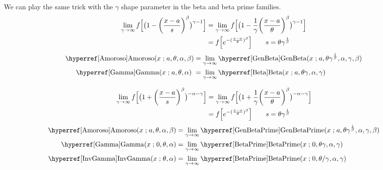 We can play the same trick with the $\gamma$ shape parameter in the beta  and beta prime families.
\begin{align*}
\lim_{\gamma \rightarrow\infty} f\Bigl[ \bigl(1- \Left(\frac{x-a}{s}\Right)^{\beta} \bigr)^{\gamma-1} \Bigr]
& = \lim_{\gamma \rightarrow\infty} f\Bigl[ \bigl(1-\frac{1}{\gamma} \Left(\frac{x-a}{\theta}\Right)^{\beta} \bigr)^{\gamma-1} \Bigr]
\checked
\\ & =  f\Bigl[ e^{-(\frac{x-a}{\theta})^\beta} \Bigr] 
\qquad s = \theta \gamma^{\frac{1}{\beta}} \checked
\end{align*}
% 
\begin{align*}
\opr{Amoroso}(x\given a,\theta,\alpha, \beta)   & =
\lim_{\gamma\rightarrow\infty} \opr{GenBeta}(x\given a, \theta \gamma^{\frac{1}{\beta}} ,\alpha, \gamma, \beta )
\checked
\\
\opr{Gamma}(x\given a, \theta,\alpha)   \
& =  \lim_{\gamma\rightarrow\infty} \opr{Beta}(x\given a, \theta \gamma ,\alpha, \gamma ) \checked
\end{align*}



\begin{align*}
\lim_{\gamma \rightarrow\infty} f\Bigl[ \bigl(1+ \Left(\frac{x-a}{s}\Right)^{\beta} \bigr)^{-\alpha-\gamma} \Bigr]
& = \lim_{\gamma \rightarrow\infty} f\Bigl[ \bigl(1+\frac{1}{\gamma} \Left(\frac{x-a}{\theta}\Right)^{\beta} \bigr)^{-\alpha-\gamma} \Bigr] \checked
\\ & =  f\Bigl[ e^{-(\frac{x-a}{\theta})^\beta} \Bigr] 
\qquad s = \theta \gamma^{\frac{1}{\beta}} \checked
\end{align*}
%
\begin{align*}
\opr{Amoroso}(x \given a,\theta,\alpha, \beta)  & =
\lim_{\gamma\rightarrow\infty} \opr{GenBetaPrime}(x\given a, \theta \gamma^{\frac{1}{\beta}} ,\alpha, \gamma, \beta ) 
\checked
\\
\opr{Gamma}(x\given 0, \theta,\alpha)  
& =
\lim_{\gamma\rightarrow\infty} \opr{BetaPrime}(x\given 0, \theta \gamma ,\alpha, \gamma ) \checked
\\
\opr{InvGamma}(x\given \theta,\alpha) 
& =
\lim_{\gamma\rightarrow\infty} \opr{BetaPrime}(x\given 0, \theta/ \gamma ,\alpha, \gamma )  \checked
\end{align*}

